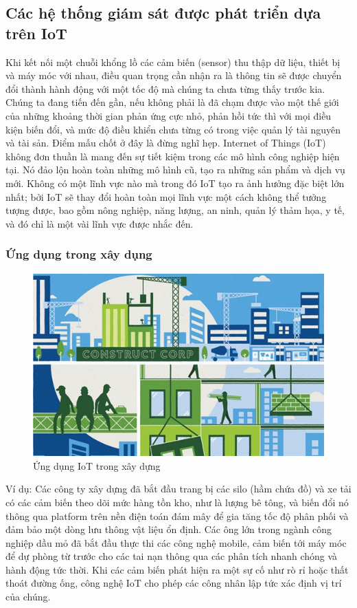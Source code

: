 	
\subsection{Các hệ thống giám sát được phát triển dựa trên IoT}
Khi kết nối một chuỗi khổng lồ các cảm biến (sensor) thu thập dữ liệu, thiết bị và máy móc với nhau, điều quan trọng cần nhận ra là thông tin sẽ được chuyển đổi thành hành động với một tốc độ mà chúng ta chưa từng thấy trước kia. Chúng ta đang tiến đến gần, nếu không phải là đã chạm được vào một thế giới của những khoảng thời gian phản ứng cực nhỏ, phản hồi tức thì với mọi điều kiện biến đổi, và mức độ điều khiển chưa từng có trong việc quản lý tài nguyên và tài sản.
Điểm mấu chốt ở đây là đừng nghĩ hẹp. Internet of Things (IoT) không đơn thuần là mang đến sự tiết kiệm trong các mô hình công nghiệp hiện tại. Nó đảo lộn hoàn toàn những mô hình cũ, tạo ra những sản phẩm và dịch vụ mới. Không có một lĩnh vực nào mà trong đó IoT tạo ra ảnh hưởng đặc biệt lớn nhất; bởi IoT sẽ thay đổi hoàn toàn mọi lĩnh vực một cách không thể tưởng tượng được, bao gồm nông nghiệp, năng lượng, an ninh, quản lý thảm họa, y tế, và đó chỉ là một vài lĩnh vực được nhắc đến.

\subsubsection*{Ứng dụng trong xây dụng }
\begin{figure}[H] 
\centering    
\includegraphics[width=1\textwidth]{pic8}
\caption[Ứng dụng IoT trong xây dựng ]{Ứng dụng IoT trong xây dựng }
\label{fig:pic8}
\end{figure}

Ví dụ: Các công ty xây dựng đã bắt đầu trang bị các silo (hầm chứa đồ) và xe tải có các cảm biến theo dõi mức hàng tồn kho, như là lượng bê tông, và biến đổi nó thông qua platform trên nền điện toán đám mây để gia tăng tốc độ phân phối và đảm bảo một dòng lưu thông vật liệu ổn định. Các ông lớn trong ngành công nghiệp dầu mỏ đã bắt đầu thực thi các công nghệ mobile, cảm biến tới máy móc để dự phòng từ trước cho các tai nạn thông qua các phân tích nhanh chóng và hành động tức thời. Khi các cảm biến phát hiện ra một sự cố như rò rỉ hoặc thất thoát đường ống, công nghệ IoT cho phép các công nhân lập tức xác định vị trí của chúng.

